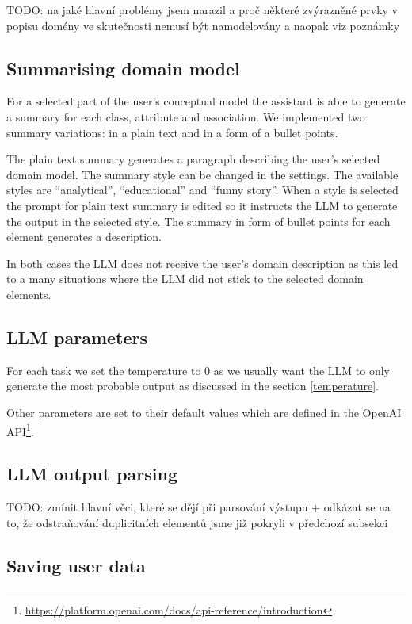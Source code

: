 TODO: na jaké hlavní problémy jsem narazil a proč některé zvýrazněné prvky v popisu domény ve skutečnosti nemusí být namodelovány a naopak viz poznámky \\


\subsection{Summarising domain model}
\label{summarising_domain_model}

For a selected part of the user's conceptual model the assistant is able to generate a summary for each class, attribute and association. We implemented two summary variations: in a plain text and in a form of a bullet points.

The plain text summary generates a paragraph describing the user's selected domain model. The summary style can be changed in the settings. The available styles are ``analytical'', ``educational'' and ``funny story''. When a style is selected the prompt for plain text summary is edited so it instructs the LLM to generate the output in the selected style. The summary in form of bullet points for each element generates a description.

In both cases the LLM does not receive the user's domain description as this led to a many situations where the LLM did not stick to the selected domain elements.


\subsection{LLM parameters}

For each task we set the temperature to $0$ as we usually want the LLM to only generate the most probable output as discussed in the section \ref{temperature}.

Other parameters are set to their default values which are defined in the OpenAI API\footnote{\url{https://platform.openai.com/docs/api-reference/introduction}}.


\subsection{LLM output parsing}

TODO: zmínit hlavní věci, které se dějí při parsování výstupu + odkázat se na to, že odstraňování duplicitních elementů jsme již pokryli v předchozí subsekci \\


\subsection{Saving user data}

